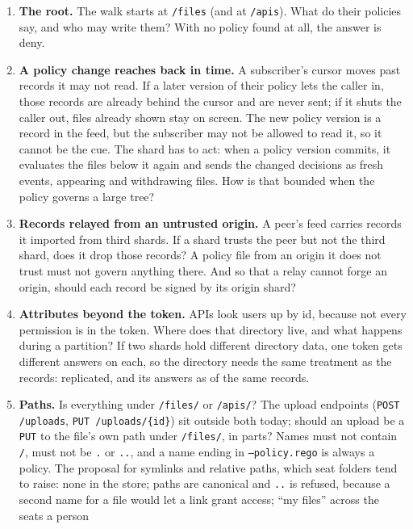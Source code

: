 \begin{enumerate}
  content. May \texttt{read}, below a folder the caller may list? May
  \texttt{write}? May a lower banner replace a higher one, or is the banner the
  greatest rank on the path?
\item \textbf{The root.} The walk starts at \texttt{/files} (and at
  \texttt{/apis}). What do their policies say, and who may write them? With no
  policy found at all, the answer is deny.
\item \textbf{A policy change reaches back in time.} A subscriber's cursor moves
  past records it may not read. If a later version of their policy lets the caller
  in, those records are already behind the cursor and are never sent; if it shuts
  the caller out, files already shown stay on screen. The new policy version is a
  record in the feed, but the subscriber may not be allowed to read it, so it
  cannot be the cue. The shard has to act: when a policy version commits, it
  evaluates the files below it again and sends the changed decisions as fresh
  events, appearing and withdrawing files. How is that bounded when the policy
  governs a large tree?
\item \textbf{Records relayed from an untrusted origin.} A peer's feed carries
  records it imported from third shards. If a shard trusts the peer but not the
  third shard, does it drop those records? A policy file from an origin it does
  not trust must not govern anything there. And so that a relay cannot forge an
  origin, should each record be signed by its origin shard?
\item \textbf{Attributes beyond the token.} APIs look users up by id, because not
  every permission is in the token. Where does that directory live, and what
  happens during a partition? If two shards hold different directory data, one
  token gets different answers on each, so the directory needs the same treatment
  as the records: replicated, and its answers as of the same records.
\item \textbf{Paths.} Is everything under \texttt{/files/} or \texttt{/apis/}? The
  upload endpoints (\texttt{POST /uploads}, \texttt{PUT /uploads/\{id\}}) sit
  outside both today; should an upload be a \texttt{PUT} to the file's own path
  under \texttt{/files/}, in parts?
  Names must not contain \texttt{/}, must not be \texttt{.} or \texttt{..}, and a
  name ending in \texttt{--policy.rego} is always a policy. The proposal for
  symlinks and relative paths, which seat folders tend to raise: none in the
  store; paths are canonical and \texttt{..} is refused, because a second name for
  a file would let a link grant access; ``my files'' across the seats a person

\end{enumerate}
